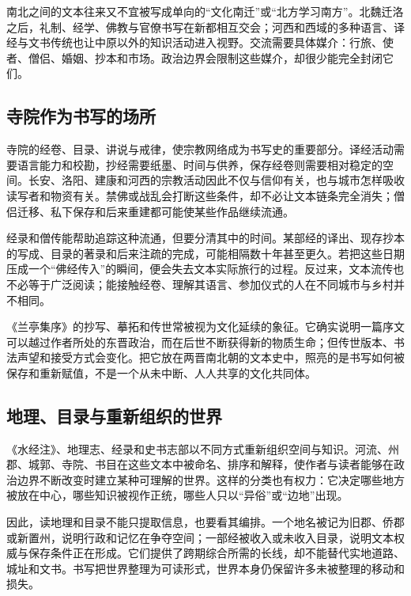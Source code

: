 南北之间的文本往来又不宜被写成单向的“文化南迁”或“北方学习南方”。北魏迁洛之后，礼制、经学、佛教与官僚书写在新都相互交会；河西和西域的多种语言、译经与文书传统也让中原以外的知识活动进入视野。交流需要具体媒介：行旅、使者、僧侣、婚姻、抄本和市场。政治边界会限制这些媒介，却很少能完全封闭它们。

\subsection{寺院作为书写的场所}

寺院的经卷、目录、讲说与戒律，使宗教网络成为书写史的重要部分。译经活动需要语言能力和校勘，抄经需要纸墨、时间与供养，保存经卷则需要相对稳定的空间。长安、洛阳、建康和河西的宗教活动因此不仅与信仰有关，也与城市怎样吸收读写者和物资有关。禁佛或战乱会打断这些条件，却不必让文本链条完全消失；僧侣迁移、私下保存和后来重建都可能使某些作品继续流通。

经录和僧传能帮助追踪这种流通，但要分清其中的时间。某部经的译出、现存抄本的写成、目录的著录和后来注疏的完成，可能相隔数十年甚至更久。若把这些日期压成一个“佛经传入”的瞬间，便会失去文本实际旅行的过程。反过来，文本流传也不必等于广泛阅读；能接触经卷、理解其语言、参加仪式的人在不同城市与乡村并不相同。

\begin{textwindow}[书写的连续不是不变]
《兰亭集序》的抄写、摹拓和传世常被视为文化延续的象征。它确实说明一篇序文可以越过作者所处的东晋政治，而在后世不断获得新的物质生命；但传世版本、书法声望和接受方式会变化。把它放在两晋南北朝的文本史中，照亮的是书写如何被保存和重新赋值，不是一个从未中断、人人共享的文化共同体。
\end{textwindow}

\subsection{地理、目录与重新组织的世界}

《水经注》、地理志、经录和史书志部以不同方式重新组织空间与知识。河流、州郡、城郭、寺院、书目在这些文本中被命名、排序和解释，使作者与读者能够在政治边界不断改变时建立某种可理解的世界。这样的分类也有权力：它决定哪些地方被放在中心，哪些知识被视作正统，哪些人只以“异俗”或“边地”出现。

因此，读地理和目录不能只提取信息，也要看其编排。一个地名被记为旧郡、侨郡或新置州，说明行政和记忆在争夺空间；一部经被收入或未收入目录，说明文本权威与保存条件正在形成。它们提供了跨期综合所需的长线，却不能替代实地道路、城址和文书。书写把世界整理为可读形式，世界本身仍保留许多未被整理的移动和损失。

